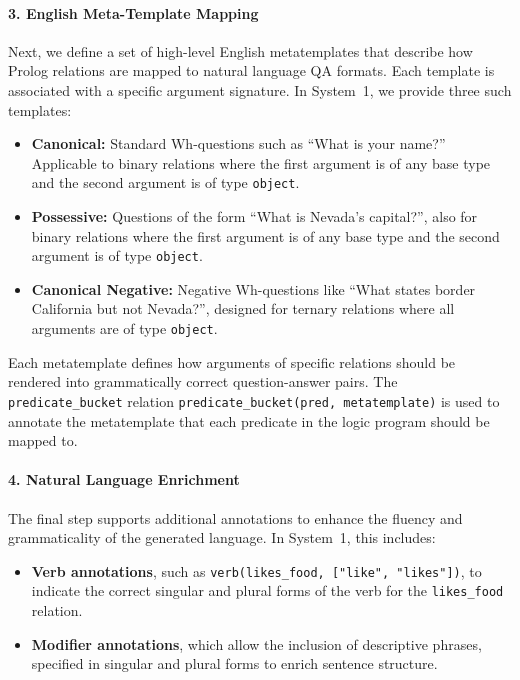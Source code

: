 \documentclass{article}
\begin{document}
\paragraph{3. English Meta-Template Mapping} 
Next, we define a set of high-level English metatemplates that describe how Prolog relations are mapped to natural 
language QA formats. Each template is associated with a specific argument signature. In System~1, we provide three 
such templates:

\begin{itemize}
    \item \textbf{Canonical:} Standard Wh-questions such as ``What is your name?'' Applicable to binary relations 
    where the first argument is of any base type and the second argument is of type \texttt{object}.
    \item \textbf{Possessive:} Questions of the form ``What is Nevada's capital?'', also for binary relations 
    where the first argument is of any base type and the second argument is of type \texttt{object}.
    \item \textbf{Canonical Negative:} Negative Wh-questions like ``What states border California but not Nevada?'', 
    designed for ternary relations where all arguments are of type \texttt{object}.
\end{itemize}

Each metatemplate defines how arguments of specific relations should be rendered into grammatically correct 
question-answer pairs. 
The \texttt{predicate\_bucket} relation \texttt{predicate\_bucket(pred, metatemplate)} is used 
to annotate the metatemplate that each predicate in the logic program should be mapped to.

\paragraph{4. Natural Language Enrichment} 
The final step supports additional annotations to enhance the fluency and grammaticality of the generated language. 
In System~1, this includes:

\begin{itemize}
    \item \textbf{Verb annotations}, such as \texttt{verb(likes\_food, ["like", "likes"])}, to indicate the 
    correct singular and plural forms of the verb for the \texttt{likes\_food} relation.
    \item \textbf{Modifier annotations}, which allow the inclusion of descriptive phrases, specified in 
    singular and plural forms to enrich sentence structure.
\end{itemize}
\end{document}
